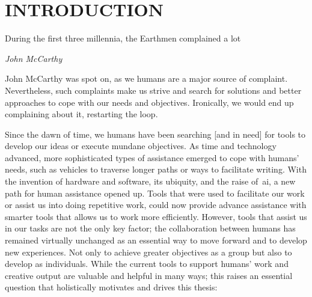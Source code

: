 \section{INTRODUCTION} \normalfont 
\label{sec:intro}

\epigraph{During the first three millennia, the Earthmen complained a lot}{\textit{John McCarthy}}



John McCarthy was spot on, as we humans are a major source of complaint. Nevertheless, such complaints make us strive and search for solutions and better approaches to cope with our needs and objectives. Ironically, we would end up complaining about it, restarting the loop.

Since the dawn of time, we humans have been searching [and in need] for tools to develop our ideas or execute mundane objectives. As time and technology advanced, more sophisticated types of assistance emerged to cope with humans' needs, such as vehicles to traverse longer paths or ways to facilitate writing. With the invention of hardware and software, its ubiquity, and the raise of~\acrfull{ai}, a new path for human assistance opened up. Tools that were used to facilitate our work or assist us into doing repetitive work, could now provide advance assistance with smarter tools that allows us to work more efficiently. However, tools that assist us in our tasks are not the only key factor; the collaboration between humans has remained virtually unchanged as an essential way to move forward and to develop new experiences. Not only to achieve greater objectives as a group but also to develop as individuals. While the current tools to support humans' work and creative output are valuable and helpful in many ways; this raises an essential question that holistically motivates and drives this thesis:

